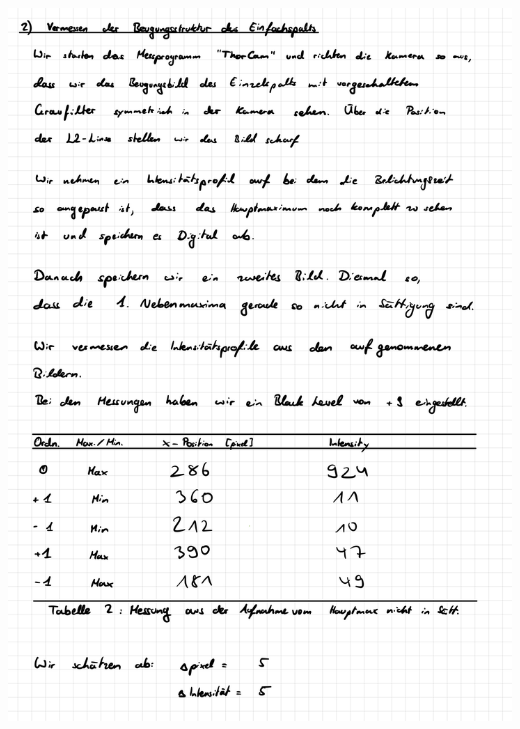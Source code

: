 \documentclass{article}
\begin{document}
\includegraphics[width=\textwidth]{graphics/messprotokoll/233 - Fourieroptik-5.jpg}
\newpage
\end{document}

